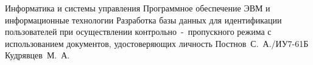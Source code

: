 \documentclass{bmstu}
\begin{document}
\makecourseworktitle
{Информатика и системы управления} %
	{Программное обеспечение ЭВМ и информационные технологии} %
	{Разработка базы данных для идентификации пользователей при осуществлении контрольно~-~пропускного режима с использованием документов, удостоверяющих личность} %
	{Постнов~С.~А./ИУ7-61Б} %
	{Кудрявцев~М.~А.} %
	{}

\maketableofcontents


%
%
%
%
\makebibliography
%
\end{document}
